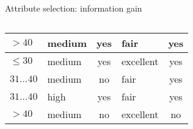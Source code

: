 \documentclass[aspectratio=169,t,table]{beamer}
\begin{document}
{\begin{frame}{Attribute selection: information gain}
\begin{columns}
\begin{column}{0.45\textwidth}
{\begin{tabular}{|l|l|c|l|c|}
            \cellcolor{yellow!20}$>40$ & \cellcolor{yellow!20}medium & \cellcolor{yellow!20}yes & \cellcolor{yellow!20}fair & \cellcolor{green!20}yes \\\hline
            \cellcolor{yellow!20}$\leq30$ & \cellcolor{yellow!20}medium & \cellcolor{yellow!20}yes & \cellcolor{yellow!20}excellent & \cellcolor{green!20}yes \\\hline
            \cellcolor{yellow!20}$31\ldots40$ & \cellcolor{yellow!20}medium & \cellcolor{yellow!20}no & \cellcolor{yellow!20}fair & \cellcolor{green!20}yes \\\hline
            \cellcolor{yellow!20}$31\ldots40$ & \cellcolor{yellow!20}high & \cellcolor{yellow!20}yes & \cellcolor{yellow!20}fair & \cellcolor{green!20}yes \\\hline
            \cellcolor{yellow!20}$>40$ & \cellcolor{yellow!20}medium & \cellcolor{yellow!20}no & \cellcolor{yellow!20}excellent & \cellcolor{red!20}no \\\hline
          \end{tabular}}
        \end{column}
      \end{columns}
    \end{frame}
  }
\end{document}
